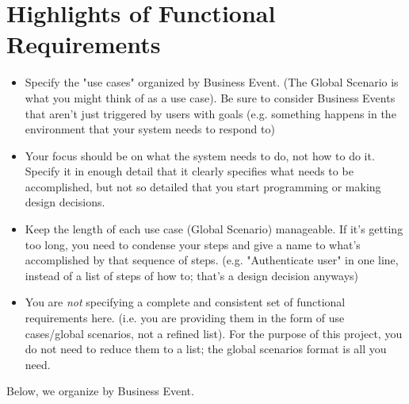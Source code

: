 \documentclass[]{article}
\begin{document}
%
%
%

\section{Highlights of Functional Requirements}
\label{sec:functional_requirements}
\begin{itemize}
	\item Specify the "use cases" organized by Business Event. (The Global Scenario is what you might think of as a use case). Be sure to consider Business Events that aren't just triggered by users with goals (e.g. something happens in the environment that your system needs to respond to)
	\item Your focus should be on what the system needs to do, not how to do it. Specify it in enough detail that it clearly specifies what needs to be accomplished, but not so detailed that you start programming or making design decisions.
	\item Keep the length of each use case (Global Scenario) manageable. If it's getting too long, you need to condense your steps and give a name to what's accomplished by that sequence of steps. (e.g. "Authenticate user" in one line, instead of a list of steps of how to; that's a design decision anyways)
	\item You are \emph{not} specifying a complete and consistent set of functional requirements here. (i.e. you are providing them in the form of use cases/global scenarios, not a refined list). For the purpose of this project, you do not need to reduce them to a list; the global scenarios format is all you need.
\end{itemize}
	Below, we organize by Business Event.
\end{document}

